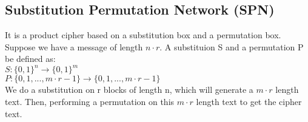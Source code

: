 \documentclass[11pt]{article}
\begin{document}
\subsection{Substitution Permutation Network (SPN)}
It is a product cipher based on a substitution box and a permutation box. Suppose we have a message of length $n \cdot r$. A substituion S and a permutation P be defined as:\\
$S: \{0, 1\}^n \rightarrow \{0, 1\}^m$\\
    $P: \{0, 1,..., m\cdot r - 1\} \rightarrow \{0, 1,..., m\cdot r - 1\} $\\
We do a substitution on r blocks of length n, which will generate a $m \cdot r$ length text. Then, performing a permutation on this $m \cdot r$ length text to get the cipher text.
\begin{center}
    

\end{center}
\end{document}
